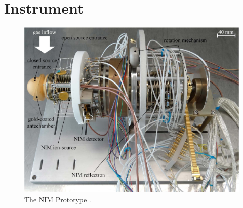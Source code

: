 \section{Instrument}\label{sec:setup}
	\begin{figure}[h] %
		\centering
		\includegraphics[width=\textwidth]{Setup/Prototype_totPic.jpg}
		\caption{The NIM Prototype \cite{Diss_Meyer}.}
		\label{fig:SetupProto}
	\end{figure}
